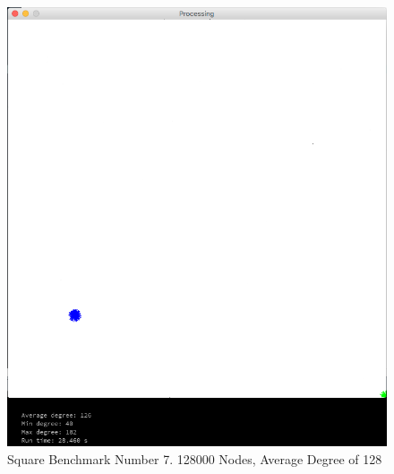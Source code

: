 \documentclass{article}
\begin{document}
\begin{center}
    \begin{figure}
        \includegraphics[scale=0.45]{./images/square_6.png}
        \caption{Square Benchmark Number 7. 128000 Nodes, Average Degree of 128}
        \label{square6}
    \end{figure}
\end{center}
\end{document}
